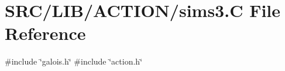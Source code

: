 \hypertarget{sims3_8_c}{}\section{S\+R\+C/\+L\+I\+B/\+A\+C\+T\+I\+O\+N/sims3.C File Reference}
\label{sims3_8_c}
{\ttfamily \#include \char`\"{}galois.\+h\char`\"{}}\newline
{\ttfamily \#include \char`\"{}action.\+h\char`\"{}}\newline
